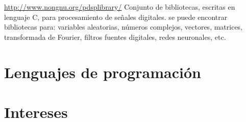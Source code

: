 \documentclass[11pt,a4paper,sans]{moderncv} %
\begin{document}
			

			{\url{http://www.nongnu.org/pdsplibrary/}}
			{}{}
			{Conjunto de bibliotecas, escritas en lenguaje C, para
 procesamiento de señales digitales. se puede encontrar
 bibliotecas para: variables aleatorias, números complejos,
 vectores, matrices, transformada de Fourier, filtros
 fuentes digitales, redes neuronales, etc.}


\section{Lenguajes de programación}




\section{Intereses}

\renewcommand{\listitemsymbol}{-~} %
\end{document}
